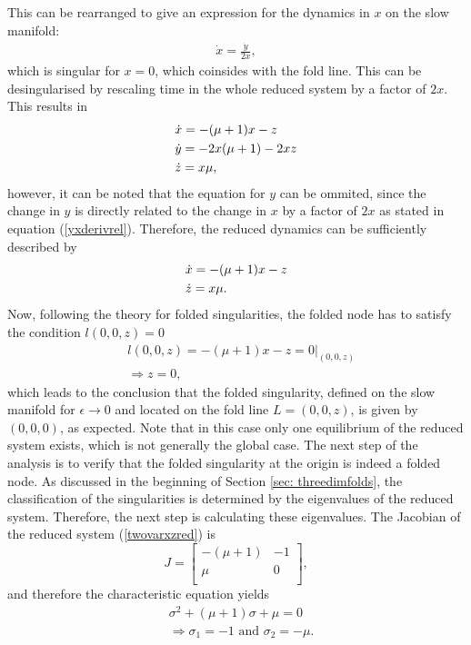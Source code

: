  This can be rearranged to give an expression for the dynamics in $x$ on the slow manifold:
\begin{align*}
\dot{x}= \frac{\dot{y}}{2x},
\end{align*}
which is singular for $x=0$, which coinsides with the fold line.
This can be desingularised by rescaling time in the whole reduced system by a factor of $2x$. This results in
\begin{align} \label{fullredsysformmo}
&\dot{x} = -(\mu+1)x - z \notag \\
&\dot{y} = - 2x (\mu +1) -2xz\\
&\dot{z} = x \mu \notag,
\end{align}
however, it can be noted that the equation for $y$ can be ommited, since the change in $y$ is directly related to the change in $x$ by a factor of $2x$ as stated in equation (\ref{yxderivrel}). Therefore, the reduced dynamics can be sufficiently described by
\begin{align}\label{twovarxzred}
&\dot{x} = -(\mu+1)x - z\\
&\dot{z} = x \mu. \notag
\end{align}
Now, following the theory for folded singularities, the folded node has to satisfy the condition $l(0,0,z)=0$
\begin{align*}
&l(0,0,z)= -(\mu+1)x - z=0 |_{(0,0,z)}\\
&\Rightarrow z=0,
\end{align*}
which leads to the conclusion that the folded singularity, defined on the slow manifold for $\epsilon \to 0$ and located on the fold line $L=(0,0,z)$, is given by $(0,0,0)$, as expected. Note that in this case only one equilibrium of the reduced system exists, which is not generally the global case.
The next step of the analysis is to verify that the folded singularity at the origin is indeed a folded node.
As discussed in the beginning of Section \ref{sec: threedimfolds}, the classification of the singularities is determined by the eigenvalues of the reduced system. Therefore, the next step is calculating these eigenvalues.
The Jacobian of the reduced system (\ref{twovarxzred}) is
\begin{equation}
J=\begin{bmatrix}
-(\mu +1) & -1 \\
\mu & 0 \\
\end{bmatrix},
\end{equation}
and therefore the characteristic equation yields
\begin{align*}
&\sigma^2 +(\mu +1)\sigma + \mu = 0 \\
&\Rightarrow \sigma_1= -1 \textrm{\ \ \ and \ \ \ } \sigma_2 = -\mu.
\end{align*}
